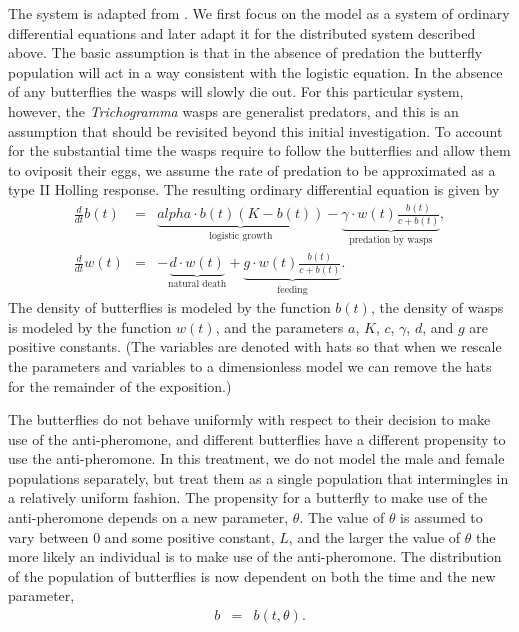 \documentclass[review,authoryear]{elsarticle}
\def\alpha{alpha}%
\newcommand{\origB}{{b}}
\newcommand{\origW}{{w}}
\newcommand{\origAlpha}{{\alpha}}
\newcommand{\origK}{{K}}
\newcommand{\origGamma}{{\gamma}}
\newcommand{\origA}{{a}}
\newcommand{\origC}{{c}}
\newcommand{\origD}{{d}}
\newcommand{\origG}{{g}}
\newcommand{\origL}{{L}}
\newcommand{\origTheta}{{\theta}}
\newcommand{\origT}{{t}}
\begin{document}
The system is adapted from \cite{TEWA20134825}. We
first focus on the model as a system of ordinary differential
equations and later adapt it for the distributed system described
above. The basic assumption is that in the absence of predation the
butterfly population will act in a way consistent with the logistic
equation. In the absence of any butterflies the wasps will slowly die
out. For this particular system, however, the \textit{Trichogramma}
wasps are generalist predators, and this is an assumption that should
be revisited beyond this initial investigation.  To account for the
substantial time the wasps require to follow the butterflies and allow
them to oviposit their eggs, we assume the rate of predation to be
approximated as a type II Holling response\citep{TEWA20134825}.  The
resulting ordinary differential equation is given by
\begin{eqnarray}
  \label{eq:initialSystem1}
  \frac{d}{d\origT} \origB(\origT) & = & \underbrace{\origAlpha \cdot \origB(\origT) (\origK - \origB(\origT))}_\text{logistic growth}
                               - \underbrace{\origGamma \cdot \origW(\origT) \frac{\origB(\origT)}{\origC+\origB(\origT)}}_\text{predation by wasps}, \\
  \label{eq:initialSystem2}
  \frac{d}{d\origT} \origW(\origT) & = & -\underbrace{\origD \cdot \origW(\origT)}_\text{natural death} + \underbrace{\origG \cdot \origW(\origT) \frac{\origB(\origT)}{\origC+\origB(\origT)}}_\text{feeding}.
\end{eqnarray}
The density of butterflies is modeled by the function
$\origB(\origT)$, the density of wasps is modeled by the function
$\origW(\origT)$, and the parameters $\origA$, $\origK$, $\origC$,
$\origGamma$, $\origD$, and $\origG$ are positive constants. (The variables are denoted with hats so that when we rescale the parameters and variables to a dimensionless model we can remove the hats for the remainder of the exposition.)
 
The butterflies do not behave uniformly with respect to their decision
to make use of the anti-pheromone, and different butterflies have a
different propensity to use the anti-pheromone. In this treatment, we
do not model the male and female populations separately, but treat
them as a single population that intermingles in a relatively uniform
fashion. The propensity for a butterfly to make use of the
anti-pheromone depends on a new parameter, $\origTheta$. The value of
$\origTheta$ is assumed to vary between $0$ and some positive constant,
$\origL$, and the larger the value of $\origTheta$ the more likely an
individual is to make use of the anti-pheromone. The distribution of
the population of butterflies is now dependent on both the time and
the new parameter,
\begin{eqnarray}
  \origB & = & \origB(\origT,\origTheta).
\end{eqnarray}
\end{document}

